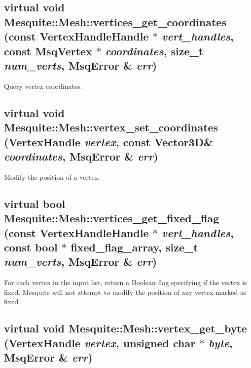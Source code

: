 \subsection{\setlength{\rightskip}{0pt plus 5cm}virtual void Mesquite::Mesh::vertices\_\-get\_\-coordinates (const VertexHandle\-Handle $\ast$ {\em vert\_\-handles}, const MsqVertex $\ast$ {\em coordinates}, size\_\-t {\em num\_\-verts}, {\bf Msq\-Error} \& {\em err})\hspace{0.3cm}{\tt  [pure virtual]}}

Query vertex coordinates.

\subsection{\setlength{\rightskip}{0pt plus 5cm}virtual void Mesquite::Mesh::vertex\_\-set\_\-coordinates (Vertex\-Handle {\em vertex}, 
const Vector3D\& {\em coordinates}, {\bf Msq\-Error} \& {\em err})\hspace{0.3cm}{\tt  [pure virtual]}}

Modify the position of a vertex.

\subsection{\setlength{\rightskip}{0pt plus 5cm}virtual bool Mesquite::Mesh::vertices\_\-get\_\-fixed\_\-flag (const VertexHandle\-Handle $\ast$ {\em vert\_\-handles}, const bool $\ast$ fixed\_flag\_array, size\_\-t {\em num\_\-verts}, {\bf Msq\-Error} \& {\em err})\hspace{0.3cm}{\tt  [pure virtual]}}\label{classMesquite_1_1Mesh_a7}

For each vertex in the input list, return a Boolean flag specifying if the vertex is fixed.  Mesquite will not attempt to modify the 
position of any vertex marked as fixed.

\subsection{\setlength{\rightskip}{0pt plus 5cm}virtual void Mesquite::Mesh::vertex\_\-get\_\-byte (Vertex\-Handle {\em vertex}, unsigned char $\ast$ {\em byte}, {\bf Msq\-Error} \& {\em err})\hspace{0.3cm}{\tt  [pure virtual]}}\label{classMesquite_1_1Mesh_a13}


